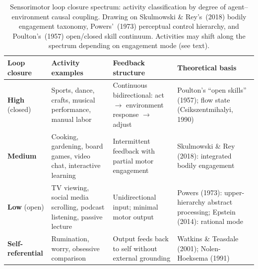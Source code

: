 \documentclass[a4paper,11pt,titlepage]{article}
\begin{document}
\begin{table}[htbp]
\centering
\caption{Sensorimotor loop closure spectrum: activity classification by degree of agent--environment causal coupling. Drawing on Skulmowski \& Rey's~(2018) bodily engagement taxonomy, Powers'~(1973) perceptual control hierarchy, and Poulton's~(1957) open/closed skill continuum. Activities may shift along the spectrum depending on engagement mode (see text).}
\label{tab:loop_closure_spectrum}
\begin{tabular}{p{2.2cm}p{3.8cm}p{3.5cm}p{4cm}}
\toprule
\textbf{Loop closure} & \textbf{Activity examples} & \textbf{Feedback structure} & \textbf{Theoretical basis} \\
\midrule
\textbf{High} (closed) & Sports, dance, crafts, musical performance, manual labor & Continuous bidirectional: act $\to$ environment response $\to$ adjust & Poulton's ``open skills'' (1957); flow state (Csikszentmihalyi, 1990) \\
\addlinespace
\textbf{Medium} & Cooking, gardening, board games, video chat, interactive learning & Intermittent feedback with partial motor engagement & Skulmowski \& Rey (2018): integrated bodily engagement \\
\addlinespace
\textbf{Low} (open) & TV viewing, social media scrolling, podcast listening, passive lecture & Unidirectional input; minimal motor output & Powers (1973): upper-hierarchy abstract processing; Epstein (2014): rational mode \\
\addlinespace
\textbf{Self-referential} & Rumination, worry, obsessive comparison & Output feeds back to self without external grounding & Watkins \& Teasdale (2001); Nolen-Hoeksema (1991) \\
\bottomrule
\end{tabular}
\end{table}
\end{document}
